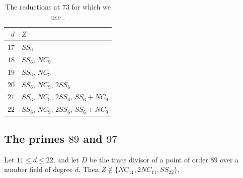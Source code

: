 \begin{table}[H]
\centering
\begin{tabular}{rl}
\toprule
$d$ & $Z$\\
\midrule
$17$ & $SS_6$\\
$18$ & $SS_6$, $NC_9$\\
$19$ & $SS_6$, $NC_9$\\
$20$ & $SS_6$, $NC_9$, $2SS_6$\\
$21$ & $SS_6$, $NC_9$, $2SS_6$, $SS_6+NC_9$\\
$22$ & $SS_6$, $NC_9$, $2SS_6$, $SS_6+NC_9$\\
\bottomrule
\end{tabular}
\medskip
\caption{The reductions at $73$ for which we use .}
\label{table:73}
\end{table}

\subsection{The primes \texorpdfstring{$89$}{89} and \texorpdfstring{$97$}{97}}

\begin{proposition}\label{prop:89}
Let $11\leq d\leq 22$, and let $D$ be the trace divisor of a point of order $89$ over a number field of degree $d$. Then $Z\notin\{NC_{11},2NC_{11},SS_{22}\}$.
\end{proposition}

